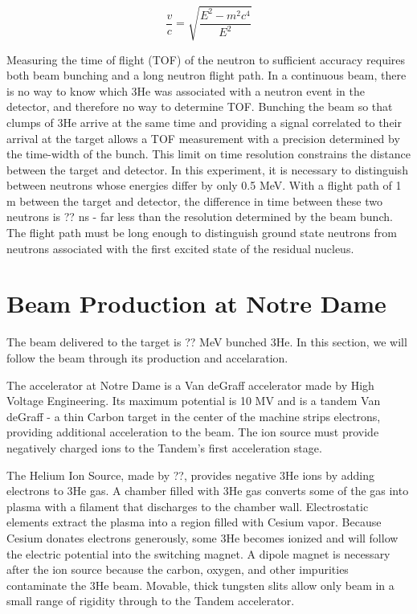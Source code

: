 \begin{equation}
\frac{v}{c} = \sqrt{\frac{E^2 - m^2c^4}{E^2}}
\label{eq:TOF}
\end{equation}

Measuring the time of flight (TOF) of the neutron to sufficient accuracy requires both beam bunching and a long neutron flight path.  In a continuous beam, there is no way to know which 3He was associated with a neutron event in the detector, and therefore no way to determine TOF.  Bunching the beam so that clumps of 3He arrive at the same time and providing a signal correlated to their arrival at the target allows a TOF measurement with a precision determined by the time-width of the bunch.  This limit on time resolution constrains the distance between the target and detector.  In this experiment, it is necessary to distinguish between neutrons whose energies differ by only 0.5 MeV.  With a flight path of 1 m between the target and detector, the difference in time between these two neutrons is ?? ns - far less than the resolution determined by the beam bunch.  The flight path must be long enough to distinguish ground state neutrons from neutrons associated with the first excited state of the residual nucleus.

\section{Beam Production at Notre Dame}
The beam delivered to the target is ?? MeV bunched 3He.  In this section, we will follow the beam through its production and accelaration.

The accelerator at Notre Dame is a Van deGraff accelerator made by High Voltage Engineering.  Its maximum potential is 10 MV and is a tandem Van deGraff - a thin Carbon target in the center of the machine strips electrons, providing additional acceleration to the beam.  The ion source must provide negatively charged ions to the Tandem's first acceleration stage.

The Helium Ion Source, made by ??, provides negative 3He ions by adding electrons to 3He gas.  A chamber filled with 3He gas converts some of the gas into plasma with a filament that discharges to the chamber wall.  Electrostatic elements extract the plasma into a region filled with Cesium vapor.  Because Cesium donates electrons generously, some 3He becomes ionized and will follow the electric potential into the switching magnet.  A dipole magnet is necessary after the ion source because the carbon, oxygen, and other impurities contaminate the 3He beam.  Movable, thick tungsten slits allow only beam in a small range of rigidity through to the Tandem accelerator.

